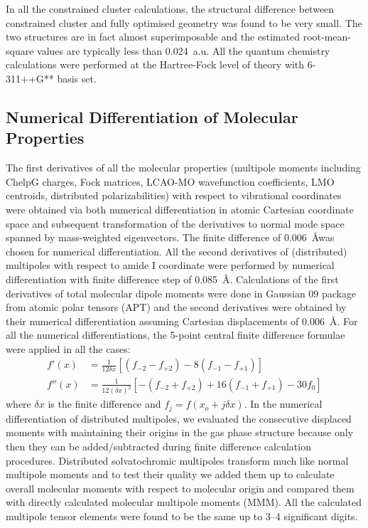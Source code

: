 \documentclass[a4paper,titlepage,twoside,fleqn,12pt]{book}
\begin{document}
\begin{appendices}
\begin{refsection}
In all the constrained cluster calculations, the
structural difference between constrained cluster and fully
optimised geometry was found to be very small. The two
structures are in fact almost superimposable and the estimated
root\hyp{}mean\hyp{}square values are typically less than 0.024~a.u. 
All the quantum chemistry calculations were performed
at the Hartree\hyp{}Fock level of theory \citep{Roothaan.RevModPhys.1951} 
with 6-311++G** basis
set. \citep{Krishnan.Binkley.Seeger.Pople.JCP.1980,
McLean.Chandler.JCP.1980}

\subsection{Numerical Differentiation of Molecular Properties}

The first derivatives of all the molecular properties
(multipole moments including ChelpG charges, Fock matrices, LCAO\hyp{}MO
wavefunction coefficients, LMO centroids, distributed polarizabilities)
with respect to
vibrational coordinates were obtained via both numerical differentiation
in atomic Cartesian coordinate space and subsequent
transformation of the derivatives to normal mode space
spanned by mass\hyp{}weighted eigenvectors. The finite difference
of 0.006~\AA was chosen for numerical differentiation. All the
second derivatives of (distributed) multipoles with respect to
amide I coordinate were performed by numerical differentiation
with finite difference step of 0.085~\AA. Calculations
of the first derivatives of total molecular dipole moments
were done in {\sc Gaussian 09} package from atomic polar
tensors (APT) and the second derivatives were obtained by
their numerical differentiation assuming Cartesian displacements
of 0.006~\AA. For all the numerical differentiations, the
5\hyp{}point central finite difference formulae were applied in all the
cases:
%
\begin{subequations}
 \begin{align}
   f'(x) &= \frac{1}{12\delta x} \left[
 \left( f_{-2} - f_{+2} \right) - 
8\left( f_{-1} - f_{+1} \right)
\right] \\
  f''(x) &= \frac{1}{12(\delta x)^2} \left[
 -\left( f_{-2} + f_{+2} \right) + 
16\left( f_{-1} + f_{+1} \right) - 30f_0
\right]
 \end{align}
\end{subequations}
%
where $\delta x$ is the finite difference and $f_j = f(x_o + j\delta x)$. 
In the
numerical differentiation of distributed multipoles, we evaluated
the consecutive displaced moments with maintaining
their origins in the gas phase structure because only then they
can be added/subtracted during finite difference calculation
procedures. Distributed solvatochromic multipoles transform
much like normal multipole moments and to test their quality
we added them up to calculate overall molecular moments
with respect to molecular origin and compared them with directly
calculated molecular multipole moments (MMM). All
the calculated multipole tensor elements were found to be the
same up to 3--4 significant digits.


\end{refsection}
\end{appendices}
\end{document}
